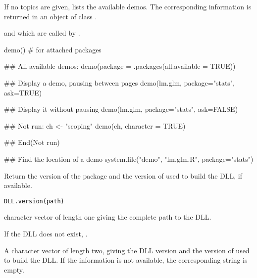 %
\begin{Details}\relax
If no topics are given,  lists the available demos.  The
corresponding information is returned in an object of class
.
\end{Details}
%
\begin{SeeAlso}\relax
{} and  which 
are called by .
\end{SeeAlso}
%
\begin{Examples}
\begin{ExampleCode}
demo() # for attached packages

## All available demos:
demo(package = .packages(all.available = TRUE))


## Display a demo, pausing between pages
demo(lm.glm, package="stats", ask=TRUE)

## Display it without pausing
demo(lm.glm, package="stats", ask=FALSE)


## Not run: 
 ch <- "scoping"
 demo(ch, character = TRUE)

## End(Not run)

## Find the location of a demo
system.file("demo", "lm.glm.R", package="stats")
\end{ExampleCode}
\end{Examples}
%
\begin{Description}\relax
Return the version of the package and the version of \R{} used to
build the DLL, if available.
\end{Description}
%
\begin{Usage}
\begin{verbatim}
DLL.version(path)
\end{verbatim}
\end{Usage}
%
\begin{Arguments}
\begin{ldescription}
\item[\code{path}] character vector of length one giving the complete path to
the DLL.
\end{ldescription}
\end{Arguments}
%
\begin{Value}
If the DLL does not exist, .

A character vector of length two, giving the DLL version and the version of
\R{} used to build the DLL.  If the information is not available, the
corresponding string is empty.
\end{Value}
